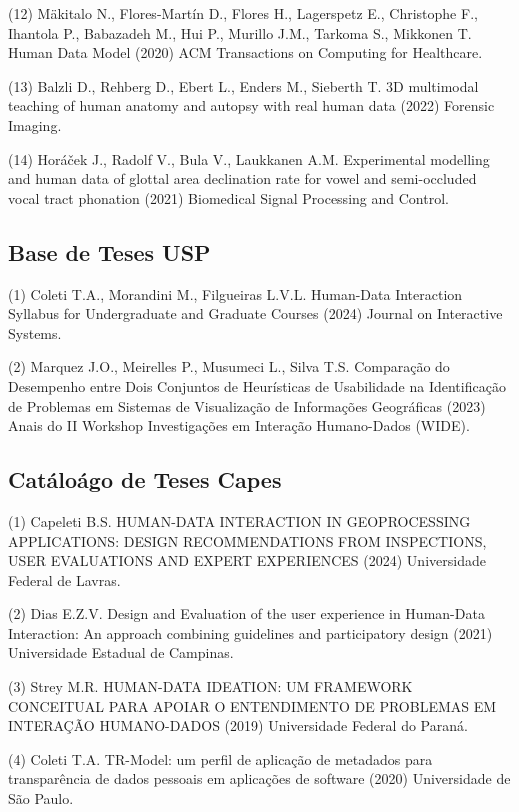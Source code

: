 \documentclass[
	12pt,				%
	oneside,			%
	a4paper,			%
	english,			%
	brazil				%
	]{abntex2ppgsi}
\begin{document}
\begin{apendicesenv}
(12) Mäkitalo N., Flores-Martín D., Flores H., Lagerspetz E., Christophe F., Ihantola P., Babazadeh M., Hui P., Murillo J.M., Tarkoma S., Mikkonen T. Human Data Model (2020) ACM Transactions on Computing for Healthcare.

(13) Balzli D., Rehberg D., Ebert L., Enders M., Sieberth T. 3D multimodal teaching of human anatomy and autopsy with real human data (2022) Forensic Imaging.

(14) Horáček J., Radolf V., Bula V., Laukkanen A.M. Experimental modelling and human data of glottal area declination rate for vowel and semi-occluded vocal tract phonation (2021) Biomedical Signal Processing and Control.

\subsection{Base de Teses USP}\label{list:tesesusp}

(1) Coleti T.A., Morandini M., Filgueiras L.V.L. Human-Data Interaction Syllabus for Undergraduate and Graduate Courses (2024) Journal on Interactive Systems.

(2) Marquez J.O., Meirelles P., Musumeci L., Silva T.S. Comparação do Desempenho entre Dois Conjuntos de Heurísticas de Usabilidade na Identificação de Problemas em Sistemas de Visualização de Informações Geográficas (2023) Anais do II Workshop Investigações em Interação Humano-Dados (WIDE).

\subsection{Catáloágo de Teses Capes}\label{list:tesescapes}

(1) Capeleti B.S. HUMAN-DATA INTERACTION IN GEOPROCESSING APPLICATIONS: DESIGN RECOMMENDATIONS FROM INSPECTIONS, USER EVALUATIONS AND EXPERT EXPERIENCES (2024) Universidade Federal de Lavras.

(2) Dias E.Z.V. Design and Evaluation of the user experience in Human-Data Interaction: An approach combining guidelines and participatory design (2021) Universidade Estadual de Campinas.

(3) Strey M.R. HUMAN-DATA IDEATION: UM FRAMEWORK CONCEITUAL PARA APOIAR O ENTENDIMENTO DE PROBLEMAS EM INTERAÇÃO HUMANO-DADOS (2019) Universidade Federal do Paraná.

(4) Coleti T.A. TR-Model: um perfil de aplicação de metadados para transparência de dados pessoais em aplicações de software (2020) Universidade de São Paulo.


\end{apendicesenv}
\end{document}
